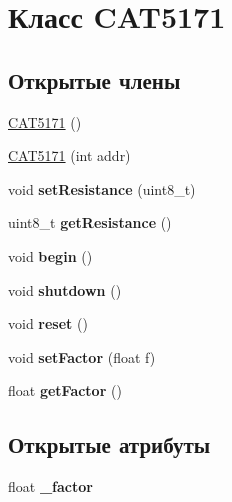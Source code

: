 \hypertarget{class_c_a_t5171}{\section{Класс C\-A\-T5171}
\label{class_c_a_t5171}
}
\subsection*{Открытые члены}
\begin{DoxyCompactItemize}
\item 
\hyperlink{class_c_a_t5171_a50d0d623ce541db0b530723bd459c212}{C\-A\-T5171} ()
\item 
\hyperlink{class_c_a_t5171_a56d0b142b876317a6bd7bea6ce297c9a}{C\-A\-T5171} (int addr)
\item 
\hypertarget{class_c_a_t5171_a169df28d0459dd762a84781dad18f047}{void {\bfseries set\-Resistance} (uint8\-\_\-t)}\label{class_c_a_t5171_a169df28d0459dd762a84781dad18f047}

\item 
\hypertarget{class_c_a_t5171_afb439488256cc204cc913d5b08cc307c}{uint8\-\_\-t {\bfseries get\-Resistance} ()}\label{class_c_a_t5171_afb439488256cc204cc913d5b08cc307c}

\item 
\hypertarget{class_c_a_t5171_a83bb9c350e9cb504b1a1a811a1c4906d}{void {\bfseries begin} ()}\label{class_c_a_t5171_a83bb9c350e9cb504b1a1a811a1c4906d}

\item 
\hypertarget{class_c_a_t5171_ae108ba39c1a26f9541050d5c29d90b68}{void {\bfseries shutdown} ()}\label{class_c_a_t5171_ae108ba39c1a26f9541050d5c29d90b68}

\item 
\hypertarget{class_c_a_t5171_ac21bd2618a96dc33460bc11e1be0c014}{void {\bfseries reset} ()}\label{class_c_a_t5171_ac21bd2618a96dc33460bc11e1be0c014}

\item 
\hypertarget{class_c_a_t5171_adc7ef5b74a244221005f45468a7edaae}{void {\bfseries set\-Factor} (float f)}\label{class_c_a_t5171_adc7ef5b74a244221005f45468a7edaae}

\item 
\hypertarget{class_c_a_t5171_abe9c498f8359a3d05457c16b07049882}{float {\bfseries get\-Factor} ()}\label{class_c_a_t5171_abe9c498f8359a3d05457c16b07049882}

\end{DoxyCompactItemize}
\subsection*{Открытые атрибуты}
\begin{DoxyCompactItemize}
\item 
\hypertarget{class_c_a_t5171_aa9089da005d31010f73a4d95c0ec831b}{float {\bfseries \-\_\-factor}}\label{class_c_a_t5171_aa9089da005d31010f73a4d95c0ec831b}

\end{DoxyCompactItemize}


